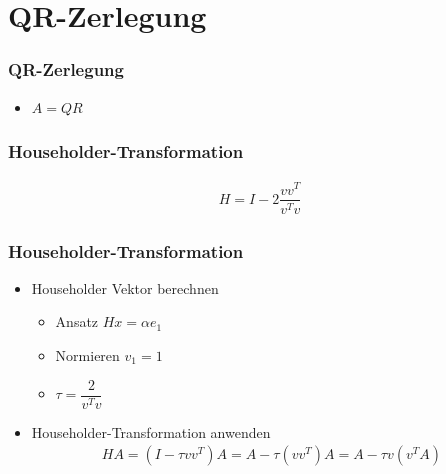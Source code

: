 \section{QR-Zerlegung}
\begin{frame}
	\frametitle{QR-Zerlegung}
	\vspace{-4cm}
	\begin{itemize}
		\item $ A = QR $
	\end{itemize}
\end{frame}

\begin{frame}
	\frametitle{Householder-Transformation}
	\vspace{-1cm}
	\begin{align*}
		H = I - 2 \dfrac{vv^T}{v^Tv}
	\end{align*}
	\centering
	\scalebox{.8}{}

\end{frame}

\begin{frame}
	\frametitle{Householder-Transformation}
	\vspace{-1cm}
	\begin{itemize}
	\item Householder Vektor berechnen\\
		\begin{itemize}
			\item Ansatz $ Hx = \alpha e_1 $
			\item Normieren $ v_1 = 1 $
			\item $ \tau = \dfrac{2}{v^Tv}$
		\end{itemize}
		

	\item  Householder-Transformation anwenden
		\begin{align*} 
		H A =(I - \tau vv^T) A= A - \tau (vv^T )A = A - \tau v(v^TA)
		\end{align*}
	\end{itemize}
\end{frame}

